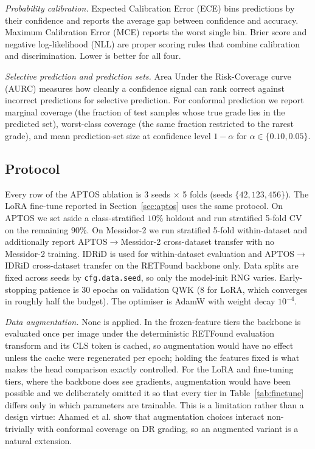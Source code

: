 \documentclass[journal]{IEEEtran}
\begin{document}
\textit{Probability calibration.} Expected Calibration Error (ECE) bins predictions by their confidence and reports the average gap between confidence and accuracy. Maximum Calibration Error (MCE) reports the worst single bin. Brier score and negative log-likelihood (NLL) are proper scoring rules that combine calibration and discrimination. Lower is better for all four.

\textit{Selective prediction and prediction sets.} Area Under the Risk-Coverage curve (AURC) measures how cleanly a confidence signal can rank correct against incorrect predictions for selective prediction. For conformal prediction we report marginal coverage (the fraction of test samples whose true grade lies in the predicted set), worst-class coverage (the same fraction restricted to the rarest grade), and mean prediction-set size at confidence level $1 - \alpha$ for $\alpha \in \{0.10, 0.05\}$.

\subsection{Protocol}
Every row of the APTOS ablation is 3 seeds $\times$ 5 folds (seeds $\{42, 123, 456\}$). The LoRA fine-tune reported in Section~\ref{sec:aptos} uses the same protocol. On APTOS we set aside a class-stratified $10\%$ holdout and run stratified 5-fold CV on the remaining $90\%$. On Messidor-2 we run stratified 5-fold within-dataset and additionally report APTOS$\to$Messidor-2 cross-dataset transfer with no Messidor-2 training. IDRiD is used for within-dataset evaluation and APTOS$\to$IDRiD cross-dataset transfer on the RETFound backbone only. Data splits are fixed across seeds by \texttt{cfg.data.seed}, so only the model-init RNG varies. Early-stopping patience is 30 epochs on validation QWK (8 for LoRA, which converges in roughly half the budget). The optimiser is AdamW with weight decay $10^{-4}$.

\emph{Data augmentation.} None is applied. In the frozen-feature tiers the backbone is evaluated once per image under the deterministic RETFound evaluation transform and its CLS token is cached, so augmentation would have no effect unless the cache were regenerated per epoch; holding the features fixed is what makes the head comparison exactly controlled. For the LoRA and fine-tuning tiers, where the backbone does see gradients, augmentation would have been possible and we deliberately omitted it so that every tier in Table~\ref{tab:finetune} differs only in which parameters are trainable. This is a limitation rather than a design virtue: Ahamed et al. \cite{ref:dr_conformal} show that augmentation choices interact non-trivially with conformal coverage on DR grading, so an augmented variant is a natural extension.
\end{document}
